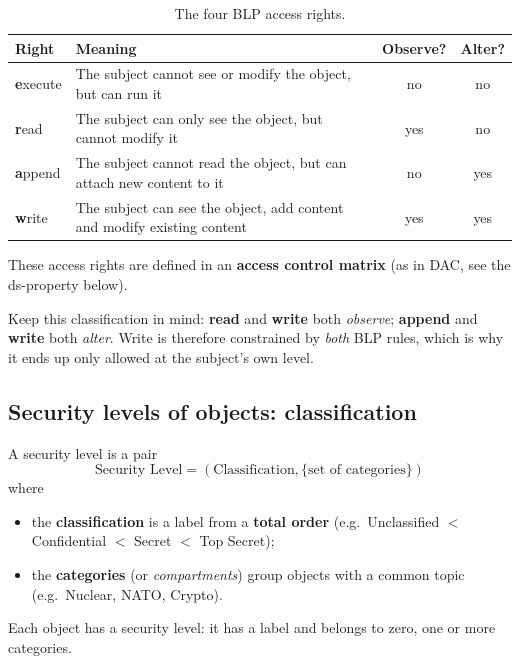 \begin{table}[h]
\centering
\begin{tabular}{@{}lp{7.3cm}cc@{}}
\toprule
\textbf{Right} & \textbf{Meaning} & \textbf{Observe?} & \textbf{Alter?} \\
\midrule
\textbf{e}xecute & The subject cannot see or modify the object, but can run it & no & no \\
\textbf{r}ead & The subject can only see the object, but cannot modify it & yes & no \\
\textbf{a}ppend & The subject cannot read the object, but can attach new content to it & no & yes \\
\textbf{w}rite & The subject can see the object, add content and modify existing content & yes & yes \\
\bottomrule
\end{tabular}
\caption{The four BLP access rights.}
\end{table}

These access rights are defined in an \textbf{access control matrix} (as in DAC, see the ds-property below).

\begin{remark}
Keep this classification in mind: \textbf{read} and \textbf{write} both \emph{observe}; \textbf{append} and \textbf{write} both \emph{alter}. Write is therefore constrained by \emph{both} BLP rules, which is why it ends up only allowed at the subject's own level.
\end{remark}

\subsection{Security levels of objects: classification}

\begin{definition}
A security level is a pair
\[
\text{Security Level} = (\text{Classification}, \{\text{set of categories}\})
\]
where
\begin{itemize}
    \item the \textbf{classification} is a label from a \textbf{total order} (e.g.\ Unclassified $<$ Confidential $<$ Secret $<$ Top Secret);
    \item the \textbf{categories} (or \emph{compartments}) group objects with a common topic (e.g.\ Nuclear, NATO, Crypto).
\end{itemize}
Each object has a security level: it has a label and belongs to zero, one or more categories.
\end{definition}

